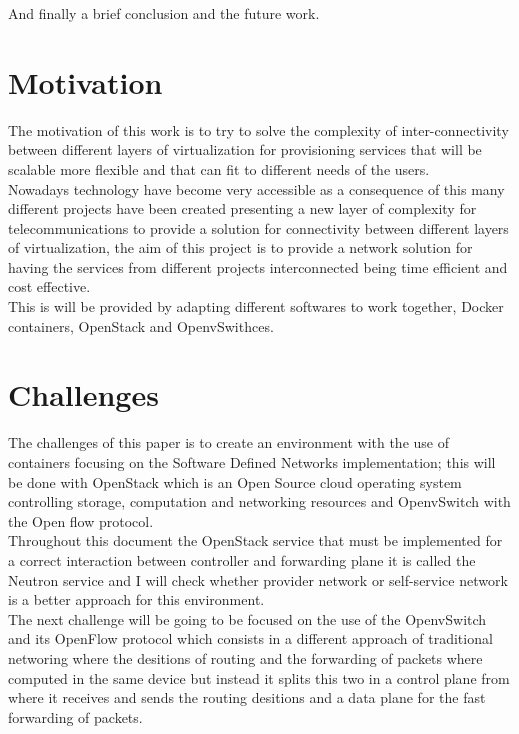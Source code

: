 And finally a brief conclusion and the future work.\\
 
\section{Motivation} 

The motivation of this work is to try to solve the complexity of inter-connectivity between different layers of virtualization for provisioning services that will be scalable more flexible and that can fit to different needs of the users.\\

Nowadays technology have become very accessible as a consequence of this many different projects have been created presenting a new layer of complexity for telecommunications to provide a solution for connectivity between different layers of virtualization, the aim of this project is to provide a network solution for having the services from different projects interconnected being time efficient and cost effective.\\

This is will be provided by adapting different softwares to work together, Docker containers, OpenStack and OpenvSwithces.\\


\section{Challenges}
 
The challenges of this paper is to create an environment with the use of containers focusing on the Software Defined Networks implementation; this will be done with OpenStack which is an Open Source cloud operating system controlling storage, computation and networking resources and OpenvSwitch with the Open flow protocol.\\

Throughout this document the OpenStack service that must be implemented for a correct interaction between controller and forwarding plane it is called the Neutron service and I will check whether provider network or self-service network is a better approach for this environment.\\

The next challenge will be going to be focused on the use of the OpenvSwitch and its OpenFlow protocol which consists in a different approach of traditional networing where the desitions of routing and the forwarding of packets where computed in the same device but instead it splits this two in a control plane from where it receives and sends the routing desitions and a data plane for the fast forwarding of packets.\\


